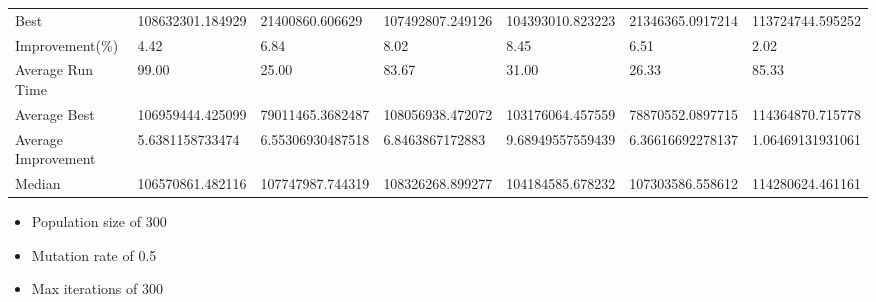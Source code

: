 \begin{table}[H]
{\begin{tabular}{lllllll}
\cellcolor[HTML]{ECF4FF}Best                & 108632301.184929 & 21400860.606629  & 107492807.249126 & 104393010.823223 & 21346365.0917214 & 113724744.595252 \\
\cellcolor[HTML]{ECF4FF}Improvement(\%)     & 4.42             & 6.84             & 8.02             & 8.45             & 6.51             & 2.02             \\
\rowcolor[HTML]{CBCEFB} 
\cellcolor[HTML]{DAE8FC}Average Run Time    & 99.00            & 25.00            & 83.67            & 31.00            & 26.33            & 85.33            \\
\rowcolor[HTML]{CBCEFB} 
\cellcolor[HTML]{DAE8FC}Average Best        & 106959444.425099 & 79011465.3682487 & 108056938.472072 & 103176064.457559 & 78870552.0897715 & 114364870.715778 \\
\rowcolor[HTML]{CBCEFB} 
\cellcolor[HTML]{DAE8FC}Average Improvement & 5.6381158733474  & 6.55306930487518 & 6.8463867172883  & 9.68949557559439 & 6.36616692278137 & 1.06469131931061 \\
\rowcolor[HTML]{CBCEFB} 
\cellcolor[HTML]{DAE8FC}Median              & 106570861.482116 & 107747987.744319 & 108326268.899277 & 104184585.678232 & 107303586.558612 & 114280624.461161
\end{tabular}%
}
\end{table}

\begin{itemize}
  \item Population size of 300
  \item Mutation rate of 0.5
  \item Max iterations of 300
\end{itemize}


